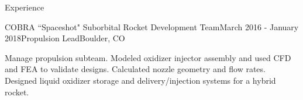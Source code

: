 \documentclass{resume} %
\begin{document}
\begin{rSection}{Experience}


\begin{rSubsection}{COBRA ``Spaceshot" Suborbital Rocket Development Team}{March 2016 - January 2018}{Propulsion Lead}{Boulder, CO}
\item {\small Manage propulsion subteam. Modeled oxidizer injector assembly and used CFD and FEA to validate designs. Calculated nozzle geometry and flow rates. Designed liquid oxidizer storage and delivery/injection systems for a hybrid rocket. }
\end{rSubsection}







\end{rSection}
\end{document}

